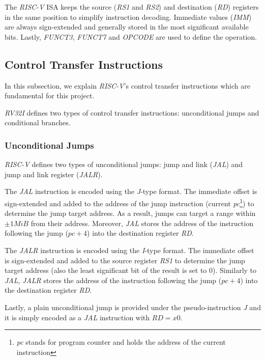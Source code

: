 The \textit{RISC-V} ISA keeps the source (\textit{RS1} and \textit{RS2}) and
destination (\textit{RD}) registers in the same position to simplify instruction
decoding. Immediate values (\textit{IMM}) are always sign-extended and generally
stored in the most significant available bits. Lastly, \textit{FUNCT3}, \textit{FUNCT7}
and \textit{OPCODE} are used to define the operation.

\subsection{Control Transfer Instructions}
\label{subsec:riscv_controltransfer}

In this subsection, we explain \textit{RISC-V}'s control transfer instructions
which are fundamental for this project.

\textit{RV32I} defines two types of control transfer instructions: unconditional
jumps and conditional branches.

\subsubsection{Unconditional Jumps}
\label{subsubsec:riscv_unconditionalj}

\textit{RISC-V} defines two types of unconditional jumps: jump and link (\textit{JAL})
and jump and link register (\textit{JALR}).

The \textit{JAL} instruction is encoded using the \textit{J}-type format. The
immediate offset is sign-extended and added to the address of the jump
instruction (current \textit{pc}\footnote{\textit{pc} stands for program counter
and holds the address of the current instruction}) to determine the jump target
address. As a result, jumps can target a range within $\pm 1 MiB$ from their
address. Moreover, \textit{JAL} stores the address of the instruction following the
jump ($\textit{pc}+ 4$) into the destination register \textit{RD}.

The \textit{JALR} instruction is encoded using the \textit{I}-type format. The immediate
offset is sign-extended and added to the source register \textit{RS1} to
determine the jump target address (also the least significant bit of the result is
set to $0$). Similarly to \textit{JAL}, \textit{JALR} stores the address of the
instruction following the jump ($\textit{pc}+ 4$) into the destination register
\textit{RD}.

Lastly, a plain unconditional jump is provided under the pseudo-instruction
\textit{J} and it is simply encoded as a \textit{JAL} instruction with
$\textit{RD}= x0$.

